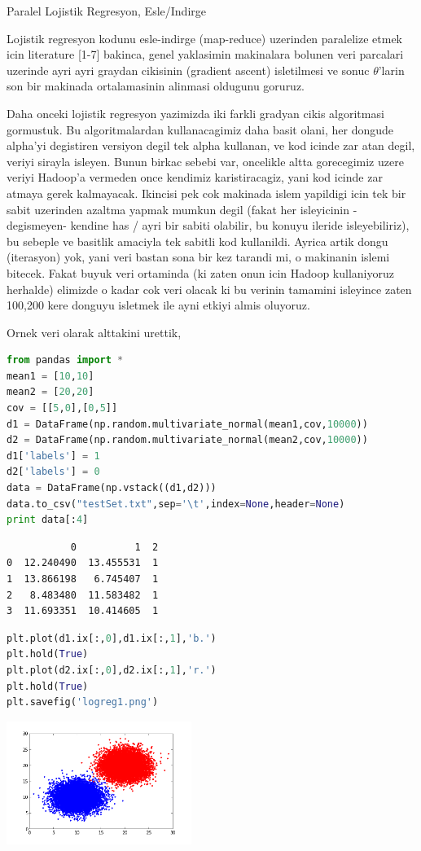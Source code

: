 \documentclass[12pt,fleqn]{article}\usepackage{../common}
\begin{document}
Paralel Lojistik Regresyon, Esle/Indirge

Lojistik regresyon kodunu esle-indirge (map-reduce) uzerinden paralelize
etmek icin literature [1-7] bakinca, genel yaklasimin makinalara bolunen
veri parcalari uzerinde ayri ayri graydan cikisinin (gradient ascent)
isletilmesi ve sonuc $\theta$'larin son bir makinada ortalamasinin alinmasi
oldugunu goruruz.

Daha onceki lojistik regresyon yazimizda iki farkli gradyan cikis
algoritmasi gormustuk. Bu algoritmalardan kullanacagimiz daha basit olani,
her dongude alpha'yi degistiren versiyon degil tek alpha kullanan, ve kod
icinde zar atan degil, veriyi sirayla isleyen. Bunun birkac sebebi var,
oncelikle altta gorecegimiz uzere veriyi Hadoop'a vermeden once kendimiz
karistiracagiz, yani kod icinde zar atmaya gerek kalmayacak. Ikincisi pek
cok makinada islem yapildigi icin tek bir sabit uzerinden azaltma yapmak
mumkun degil (fakat her isleyicinin -degismeyen- kendine has / ayri bir
sabiti olabilir, bu konuyu ileride isleyebiliriz), bu sebeple ve basitlik
amaciyla tek sabitli kod kullanildi. Ayrica artik dongu (iterasyon) yok,
yani veri bastan sona bir kez tarandi mi, o makinanin islemi bitecek. Fakat
buyuk veri ortaminda (ki zaten onun icin Hadoop kullaniyoruz herhalde)
elimizde o kadar cok veri olacak ki bu verinin tamamini isleyince zaten
100,200 kere donguyu isletmek ile ayni etkiyi almis oluyoruz.

Ornek veri olarak alttakini urettik,

\begin{lstlisting}[language=Python]
from pandas import *
mean1 = [10,10]
mean2 = [20,20]
cov = [[5,0],[0,5]]
d1 = DataFrame(np.random.multivariate_normal(mean1,cov,10000))
d2 = DataFrame(np.random.multivariate_normal(mean2,cov,10000))
d1['labels'] = 1
d2['labels'] = 0
data = DataFrame(np.vstack((d1,d2)))
data.to_csv("testSet.txt",sep='\t',index=None,header=None)
print data[:4]
\end{lstlisting}

\begin{verbatim}
           0          1  2
0  12.240490  13.455531  1
1  13.866198   6.745407  1
2   8.483480  11.583482  1
3  11.693351  10.414605  1
\end{verbatim}

\begin{lstlisting}[language=Python]
%pylab inline
plt.plot(d1.ix[:,0],d1.ix[:,1],'b.')
plt.hold(True)
plt.plot(d2.ix[:,0],d2.ix[:,1],'r.')
plt.hold(True)
plt.savefig('logreg1.png')
\end{lstlisting}

\includegraphics[height=4cm]{logreg1.png}
\end{document}

